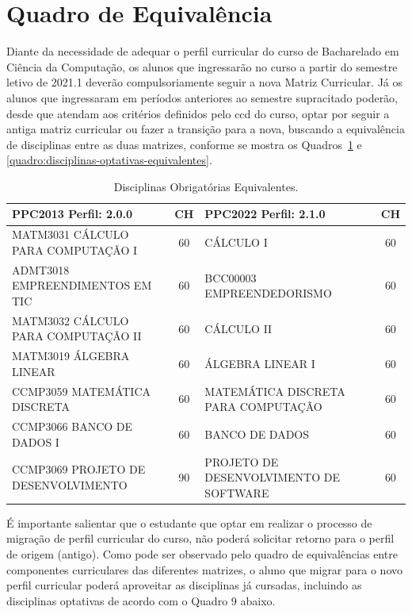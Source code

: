 \documentclass[
	12pt,				%
	openright,			%
  oneside,     %
	a4paper,			%
 hyphens,
	chapter=TITLE,		%
	english,			%
	french,				%
	spanish,			%
	brazil				%
	]{abntex2}
\begin{document}
  \section{Quadro de Equivalência}
  
  Diante da necessidade de adequar o perfil curricular do curso de Bacharelado em Ciência da Computação, os alunos que ingressarão no curso a partir do semestre letivo de 2021.1 deverão compulsoriamente seguir a nova Matriz Curricular. Já os alunos que ingressaram em períodos anteriores ao semestre supracitado poderão, desde que atendam aos critérios definidos pelo \acrfull{ccd} do curso, optar por seguir a antiga matriz curricular ou fazer a transição para a nova, buscando a equivalência de disciplinas entre as duas matrizes, conforme se mostra os Quadros~\ref{quadro:disciplinas-obrigatorias-equivalentes} e \ref{quadro:disciplinas-optativas-equivalentes}. 
  
  \begin{center}
    
    \begin{tiny}
      \begin{longtable}{p{6.5cm}cp{6.5cm}c}
        \caption{\label{quadro:disciplinas-obrigatorias-equivalentes}Disciplinas Obrigatórias Equivalentes.}\\
      \toprule
      \textbf{PPC2013 Perfil: 2.0.0} & \textbf{CH} & \textbf{PPC2022 Perfil: 2.1.0} & \textbf{CH}\\
      \midrule
      MATM3031 CÁLCULO PARA COMPUTAÇÃO I  & 60 & CÁLCULO I & 60 \\ \midrule
      ADMT3018 EMPREENDIMENTOS EM TIC & 60 & BCC00003 EMPREENDEDORISMO & 60 \\ \midrule
      MATM3032 CÁLCULO PARA COMPUTAÇÃO II  & 60 & CÁLCULO II & 60 \\ \midrule
      MATM3019 ÁLGEBRA LINEAR  & 60 & ÁLGEBRA LINEAR I & 60 \\ \midrule
      CCMP3059 MATEMÁTICA DISCRETA  & 60 & MATEMÁTICA DISCRETA PARA COMPUTAÇÃO & 60 \\ \midrule
      CCMP3066 BANCO DE DADOS I & 60 & BANCO DE DADOS & 60 \\ \midrule
      CCMP3069 PROJETO DE DESENVOLVIMENTO & 90 & PROJETO DE DESENVOLVIMENTO DE SOFTWARE & 60 \\
  \bottomrule
  \end{longtable}
  \end{tiny}
  \end{center}
  
  É importante salientar que o estudante que optar em realizar o processo de migração de perfil curricular do curso, não poderá solicitar retorno para o perfil de origem (antigo). Como pode ser observado pelo quadro de equivalências entre componentes curriculares das diferentes matrizes, o aluno que migrar para o novo perfil curricular poderá aproveitar as disciplinas já cursadas, incluindo as disciplinas optativas de acordo com o Quadro 9 abaixo.
  
\end{document}
